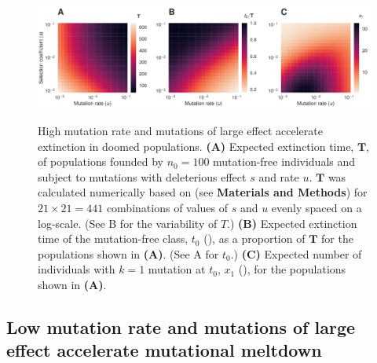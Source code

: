\documentclass[9pt,lineno]{elife}
\begin{document}
\begin{figure}[ht!]
\includegraphics[width=\linewidth]{heat.pdf}
\caption{High mutation rate and mutations of large effect accelerate extinction in doomed populations.  
%
\textbf{(A)} Expected extinction time, $\mathbf{T}$, of populations founded by $n_0=100$ mutation-free individuals and subject to mutations with deleterious effect $s$ and rate $u$.  $\mathbf{T}$ was calculated numerically based on  (see \textbf{Materials and Methods}) for $21\times21=441$ combinations of values of $s$ and $u$ evenly spaced on a log-scale.  (See B for the variability of $T$.)
%
\textbf{(B)} Expected extinction time of the mutation-free class, $t_0$ (), as a proportion of $\mathbf{T}$ for the populations shown in \textbf{(A)}.  (See A for $t_0$.)
%
\textbf{(C)} Expected number of individuals with $k=1$ mutation at $t_0$, $x_1$ (), for the populations shown in \textbf{(A)}.
}
\label{fig:heat}
\label{figsupp:sf3}
\end{figure}


\subsection{Low mutation rate and mutations of large effect accelerate mutational meltdown}
\end{document}

